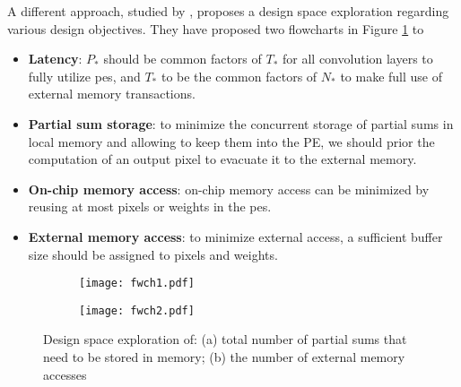 A different approach, studied by \textcite{ma_optimizing_2018}, proposes a design space exploration regarding various design objectives. They have proposed two flowcharts in Figure \ref{fig:flowchart} to
\begin{itemize}
    \item \textbf{Latency}: $P_*$ should be common factors of  $T_*$ for all convolution layers to fully utilize \acrshort{pe}s, and $T_*$ to be the common factors of  $N_*$ to make full use of external memory transactions.
    \item \textbf{Partial sum storage}: to minimize the concurrent storage of partial sums in local memory and allowing to keep them into the PE, we should prior the computation of an output pixel to evacuate it to the external memory.
    \item \textbf{On-chip memory access}: on-chip memory access can be minimized by reusing at most pixels or weights in the \acrshort{pe}s.
    \item \textbf{External memory access}: to minimize external access, a sufficient buffer size should be assigned to pixels and weights.
\end{itemize}
%
\begin{figure}
\centering
    \begin{subfigure}{.45\textwidth}
    \centering
    \texttt{[image: fwch1.pdf]}
    \caption{ }
    \end{subfigure}
    \begin{subfigure}{.45\textwidth}
    \centering
    \texttt{[image: fwch2.pdf]}
    \caption{ }
    \end{subfigure}
    \caption{Design space exploration of: (a) total number of partial sums that need to be stored in memory; (b) the number of external memory accesses \cite{ma_optimizing_2018}}
    \label{fig:flowchart}
\end{figure}

